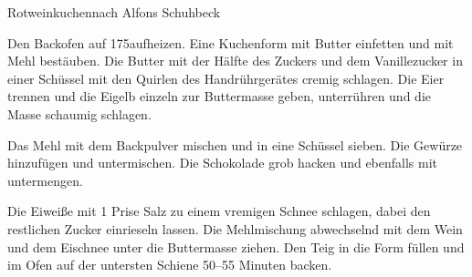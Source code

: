\begin{recipe}{Rotweinkuchen}{nach Alfons Schuhbeck}\label{Rotweinkuchen}

  \inglist

  \steps

  Den Backofen auf 175\celsius aufheizen. Eine Kuchenform mit Butter
  einfetten und mit Mehl bestäuben. Die Butter mit der Hälfte des Zuckers und
  dem Vanillezucker in einer Schüssel mit den Quirlen des Handrührgerätes
  cremig schlagen. Die Eier trennen und die Eigelb einzeln zur Buttermasse
  geben, unterrühren und die Masse schaumig schlagen.

  Das Mehl mit dem Backpulver mischen und in eine Schüssel sieben. Die
  Gewürze hinzufügen und untermischen. Die Schokolade grob hacken und
  ebenfalls mit untermengen.

  Die Eiweiße mit 1 Prise Salz zu einem vremigen Schnee schlagen, dabei den
  restlichen Zucker einrieseln lassen. Die Mehlmischung abwechselnd mit dem
  Wein und dem Eischnee unter die Buttermasse ziehen. Den Teig in die Form
  füllen und im Ofen auf der untersten Schiene 50--55 Minuten backen.

\end{recipe}
